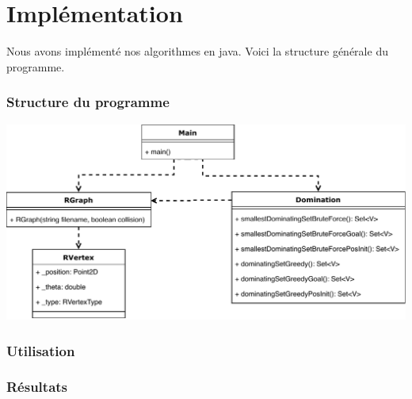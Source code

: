 \part{Implémentation}
Nous avons implémenté nos algorithmes en java. Voici la structure générale du programme.

\section{Structure du programme}
\scalebox{0.89} {
\includegraphics{robotdef.pdf}
} \newline



\section{Utilisation}

\section{Résultats}